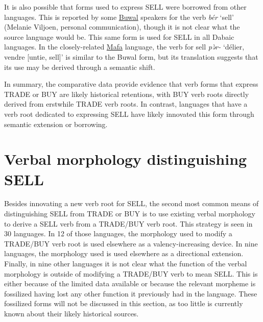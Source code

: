 It is also possible that forms used to express SELL were borrowed from other languages. This is reported by some \hyperref[buwa]{Buwal} speakers for the verb \textit{bér} `sell' (Melanie Viljoen, personal communication), though it is not clear what the source language would be. This same form is used for SELL in all Dabaic languages. In the closely-related \hyperref[mafa]{Mafa} language, the verb for sell \textit{pə̀r-} `délier, vendre [untie, sell]’ is similar to the Buwal form, but its translation suggests that its use may be derived through a semantic shift. 

In summary, the comparative data provide evidence that verb forms that express TRADE or BUY are likely historical retentions, with BUY verb roots directly derived from erstwhile TRADE verb roots. In contrast, languages that have a verb root dedicated to expressing SELL have likely innovated this form through semantic extension or borrowing. 

\section{Verbal morphology distinguishing SELL}	 \label{sec:SELLmorph}

Besides innovating a new verb root for SELL, the second most common means of distinguishing SELL from TRADE or BUY is to use existing verbal morphology to derive a SELL verb from a TRADE/BUY verb root. This strategy is seen in 30 languages. In 12 of those languages, the morphology used to modify a TRADE/BUY verb root is used elsewhere as a valency-increasing device. In nine languages, the morphology used is used elsewhere as a directional extension. Finally, in nine other languages it is not clear what the function of the verbal morphology is outside of modifying a TRADE/BUY verb to mean SELL. This is either because of the limited data available or because the relevant morpheme is fossilized having lost any other function it previously had in the language. These fossilized forms will not be discussed in this section, as too little is currently known about their likely historical sources. 

